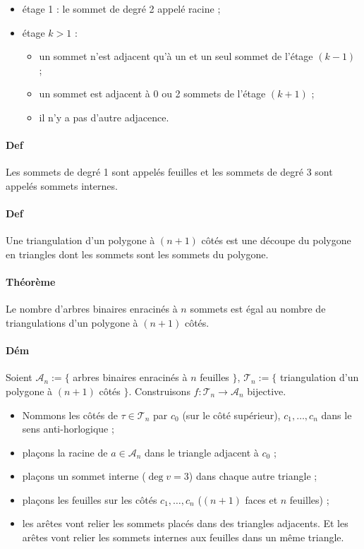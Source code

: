 \documentclass{article}
\newenvironment{lst}
	{\begin{minipage}[t]{.9\linewidth}\begin{itemize}}
	{\end{itemize}\end{minipage}}
\begin{document}
			\begin{itemize}
				\item étage 1 : le sommet de degré 2 appelé racine ;
				\item étage $k > 1$ :
					\begin{lst}
						\item un sommet n'est adjacent qu'à un et un seul sommet de l'étage $(k-1)$ ;
						\item un sommet est adjacent à 0 ou 2 sommets de l'étage $(k+1)$ ;
						\item il n'y a pas d'autre adjacence.
					\end{lst}
			\end{itemize}

			\paragraph{Def} Les sommets de degré 1 sont appelés feuilles et les sommets de degré 3 sont appelés sommets internes.

			\paragraph{Def} Une triangulation d'un polygone à $(n+1)$ côtés est une découpe du polygone en triangles dont les sommets sont les sommets du polygone.

			\paragraph{Théorème} Le nombre d'arbres binaires enracinés à $n$ sommets est égal au nombre de triangulations d'un polygone à $(n+1)$ côtés.

			\paragraph{Dém} Soient $\mathcal A_n := \{$ arbres binaires enracinés à $n$ feuilles $\}$, $\mathcal T_n := \{$ triangulation d'un polygone à $(n+1)$ côtés $\}$.
			Construisons $f : \mathcal T_n \to \mathcal A_n$ bijective.

			\begin{itemize}
				\item Nommons les côtés de $\tau \in \mathcal T_n$ par $c_0$ (sur le côté supérieur), $c_1, \ldots, c_n$ dans le sens anti-horlogique ;
				\item plaçons la racine de $a \in \mathcal A_n$ dans le triangle adjacent à $c_0$ ;
				\item plaçons un sommet interne ($\deg v = 3$) dans chaque autre triangle ;
				\item plaçons les feuilles sur les côtés $c_1, \ldots, c_n$ ($(n+1)$ faces et $n$ feuilles) ;
				\item les arêtes vont relier les sommets placés dans des triangles adjacents. Et les arêtes vont relier les sommets internes aux feuilles dans un même triangle.
			\end{itemize}
\end{document}
